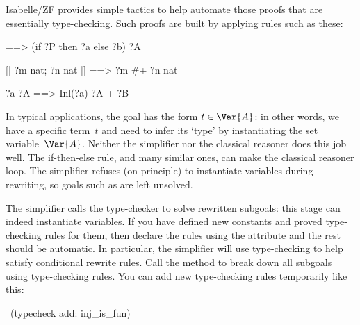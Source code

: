 Isabelle/ZF provides simple tactics to help automate those proofs that are
essentially type-checking.  Such proofs are built by applying rules such as
these:
\begin{ttbox}\isastyleminor
[| ?P ==> ?a \isasymin ?A; ~?P ==> ?b \isasymin ?A |] ==> (if ?P then ?a else ?b) \isasymin ?A

[| ?m \isasymin nat; ?n \isasymin nat |] ==> ?m #+ ?n \isasymin nat

?a \isasymin ?A ==> Inl(?a) \isasymin ?A + ?B  
\end{ttbox}
In typical applications, the goal has the form $t\in\Var{A}$: in other words,
we have a specific term~$t$ and need to infer its `type' by instantiating the
set variable~$\Var{A}$.  Neither the simplifier nor the classical reasoner
does this job well.  The if-then-else rule, and many similar ones, can make
the classical reasoner loop.  The simplifier refuses (on principle) to
instantiate variables during rewriting, so goals such as 
are left unsolved.

The simplifier calls the type-checker to solve rewritten subgoals: this stage
can indeed instantiate variables.  If you have defined new constants and
proved type-checking rules for them, then declare the rules using
the attribute  and the rest should be automatic.  In
particular, the simplifier will use type-checking to help satisfy
conditional rewrite rules. Call the method  to
break down all subgoals using type-checking rules. You can add new
type-checking rules temporarily like this:
\begin{isabelle}
\ (typecheck add: inj_is_fun)
\end{isabelle}


